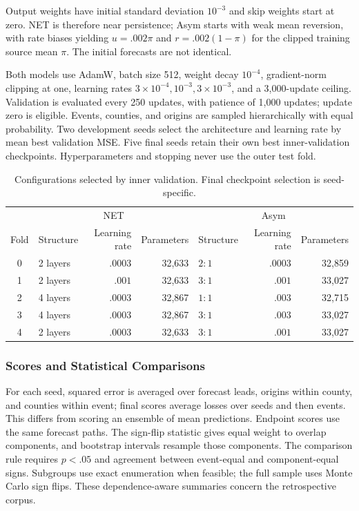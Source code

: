 Output weights have initial standard deviation $10^{-3}$ and skip weights start at zero. NET is therefore near persistence; Asym starts with weak mean reversion, with rate biases yielding $u=.002\pi$ and $r=.002(1-\pi)$ for the clipped training source mean $\pi$. The initial forecasts are not identical.

Both models use AdamW, batch size 512, weight decay $10^{-4}$, gradient-norm clipping at one, learning rates $3\times10^{-4},10^{-3},3\times10^{-3}$, and a 3,000-update ceiling. Validation is evaluated every 250 updates, with patience of 1,000 updates; update zero is eligible. Events, counties, and origins are sampled hierarchically with equal probability. Two development seeds select the architecture and learning rate by mean best validation MSE. Five final seeds retain their own best inner-validation checkpoints. Hyperparameters and stopping never use the outer test fold.

\begin{table}[htbp]
\centering\small
\caption{Configurations selected by inner validation. Final checkpoint selection is seed-specific.}
\label{tab:cvselection}
\begin{tabular}{@{}clrrlrr@{}}\toprule
 & \multicolumn{3}{c}{NET} & \multicolumn{3}{c}{Asym}\\
Fold & Structure & Learning rate & Parameters & Structure & Learning rate & Parameters\\\midrule
0 & 2 layers & $.0003$ & 32,633 & $2{:}1$ & $.0003$ & 32,859\\
1 & 2 layers & $.001$  & 32,633 & $3{:}1$ & $.001$  & 33,027\\
2 & 4 layers & $.0003$ & 32,867 & $1{:}1$ & $.003$  & 32,715\\
3 & 4 layers & $.0003$ & 32,867 & $3{:}1$ & $.003$  & 33,027\\
4 & 2 layers & $.0003$ & 32,633 & $3{:}1$ & $.001$  & 33,027\\\bottomrule
\end{tabular}
\end{table}

\subsubsection{Scores and Statistical Comparisons}
For each seed, squared error is averaged over forecast leads, origins within county, and counties within event; final scores average losses over seeds and then events. This differs from scoring an ensemble of mean predictions. Endpoint scores use the same forecast paths. The sign-flip statistic gives equal weight to overlap components, and bootstrap intervals resample those components. The comparison rule requires $p<.05$ and agreement between event-equal and component-equal signs. Subgroups use exact enumeration when feasible; the full sample uses Monte Carlo sign flips. These dependence-aware summaries concern the retrospective corpus.

